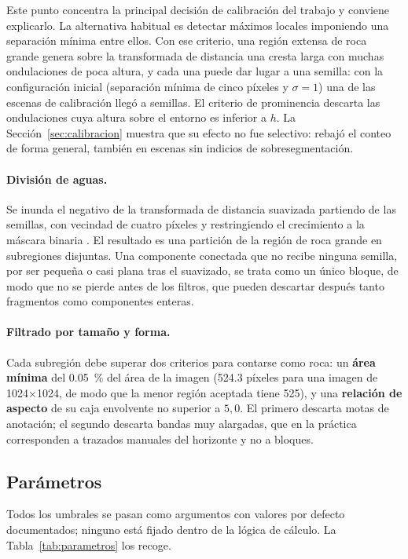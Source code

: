 Este punto concentra la principal decisión de calibración del trabajo y conviene
explicarlo. La alternativa habitual es detectar máximos locales imponiendo una separación
mínima entre ellos. Con ese criterio, una región extensa de roca grande genera sobre la
transformada de distancia una cresta larga con muchas ondulaciones de poca altura, y cada
una puede dar lugar a una semilla: con la configuración inicial (separación mínima de cinco
píxeles y $\sigma = 1$) una de las escenas de calibración llegó a \cCalSemillasA{} semillas.
El criterio de prominencia descarta las ondulaciones cuya altura sobre el entorno es inferior
a $h$. La Sección~\ref{sec:calibracion} muestra que su efecto no fue selectivo: rebajó el
conteo de forma general, también en escenas sin indicios de sobresegmentación.

\paragraph{División de aguas.} Se inunda el negativo de la transformada de distancia
suavizada partiendo de las semillas, con vecindad de cuatro píxeles y restringiendo el
crecimiento a la máscara binaria \citep{vincent1991watersheds}. El resultado es una partición de la región de roca grande
en subregiones disjuntas. Una componente conectada que no recibe ninguna semilla, por ser
pequeña o casi plana tras el suavizado, se trata como un único bloque, de modo que no se
pierde antes de los filtros, que pueden descartar después tanto fragmentos como componentes
enteras.

\paragraph{Filtrado por tamaño y forma.} Cada subregión debe superar dos criterios para
contarse como roca: un \textbf{área mínima} del \SI{0.05}{\percent} del área de la imagen
(\num{524.3} píxeles para una imagen de \num{1024}$\times$\num{1024}, de modo que la menor
región aceptada tiene \num{525}), y una
\textbf{relación de aspecto} de su caja envolvente no superior a $5{,}0$. El primero
descarta motas de anotación; el segundo descarta bandas muy alargadas, que en la práctica
corresponden a trazados manuales del horizonte y no a bloques.

\subsection{Parámetros}

Todos los umbrales se pasan como argumentos con valores por defecto documentados; ninguno
está fijado dentro de la lógica de cálculo. La Tabla~\ref{tab:parametros} los recoge.

